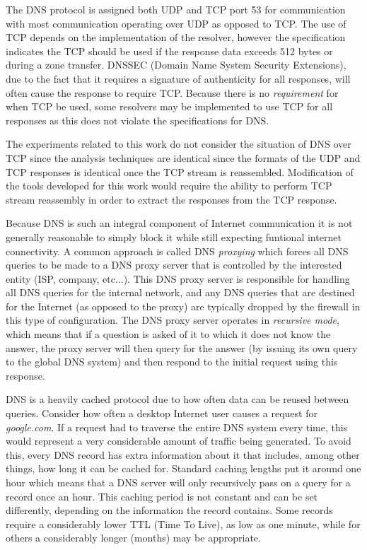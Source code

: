 \documentclass[12pt]{article}
\theoremstyle{remark}
\theoremstyle{definition}
\theoremstyle{definition}
\theoremstyle{definition}
\begin{document}
The DNS protocol is assigned both UDP and TCP port 53 for
communication with most communication operating over UDP as opposed to TCP. The
use of TCP depends on the implementation of the resolver, however the
specification indicates the TCP should be used if the response data exceeds 512
bytes or during a zone transfer\cite{rfc1035}. DNSSEC (Domain Name System
Security Extensions), due to the fact that it requires a signature of
authenticity for all responses, will often cause the response to
require TCP\cite{rfc4034}. 
Because there is no \emph{requirement} for when
TCP be used, some resolvers may be implemented to use TCP for all responses as
this does not violate the specifications for DNS.

The experiments related to this work do not consider the situation of DNS over
TCP since the analysis techniques are identical since the formats of the UDP
and TCP responses is identical once the TCP stream is reassembled. Modification
of the tools developed for this work would require the ability to perform TCP
stream reassembly in order to extract the responses from the TCP response.

Because DNS is such an integral component of Internet communication it is not
generally reasonable to simply block it while still expecting funtional internet connectivity. A common approach is called DNS \emph{proxying} which
forces all DNS queries to be made to a DNS proxy server that is controlled by
the interested entity (ISP, company, etc...). This DNS proxy server is
responsible for handling all DNS queries for the internal network, and any DNS
queries that are destined for the Internet (as opposed to the proxy) are typically dropped by the
firewall in this type of configuration. The DNS proxy server operates in
\emph{recursive mode}, which means that if a question is asked of it to which
it does not know the answer, the proxy server will then query for the answer (by
issuing its own query to the global DNS system) and then respond to the initial
request using this response.

DNS is a heavily cached protocol due to how often data can be reused between queries. Consider how often a desktop Internet user causes a request for
\emph{google.com}. If a request had to traverse the entire DNS system every
time, this would represent a very considerable amount of traffic being
generated. To avoid this, every DNS record has extra information about it that
includes, among other things, how long it can be cached for. Standard
caching lengths put it around one hour which means that a DNS server will only
recursively pass on a query for a record once an hour. This caching period is
not constant and can be set differently, depending on the information the
record contains. Some records require a considerably lower TTL (Time To Live),
as low as one minute, while for others a considerably longer (months) may be
appropriate.
\end{document}

